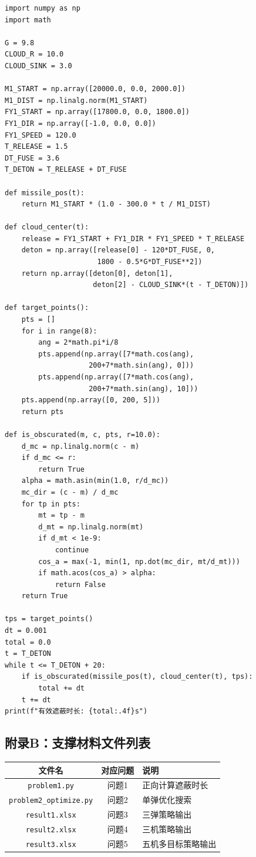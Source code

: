 \documentclass[a4paper]{ctexart}
\begin{document}
\begin{lstlisting}[caption={问题一有效遮蔽时长计算}]
import numpy as np
import math

G = 9.8
CLOUD_R = 10.0
CLOUD_SINK = 3.0

M1_START = np.array([20000.0, 0.0, 2000.0])
M1_DIST = np.linalg.norm(M1_START)
FY1_START = np.array([17800.0, 0.0, 1800.0])
FY1_DIR = np.array([-1.0, 0.0, 0.0])
FY1_SPEED = 120.0
T_RELEASE = 1.5
DT_FUSE = 3.6
T_DETON = T_RELEASE + DT_FUSE

def missile_pos(t):
    return M1_START * (1.0 - 300.0 * t / M1_DIST)

def cloud_center(t):
    release = FY1_START + FY1_DIR * FY1_SPEED * T_RELEASE
    deton = np.array([release[0] - 120*DT_FUSE, 0,
                      1800 - 0.5*G*DT_FUSE**2])
    return np.array([deton[0], deton[1],
                     deton[2] - CLOUD_SINK*(t - T_DETON)])

def target_points():
    pts = []
    for i in range(8):
        ang = 2*math.pi*i/8
        pts.append(np.array([7*math.cos(ang),
                    200+7*math.sin(ang), 0]))
        pts.append(np.array([7*math.cos(ang),
                    200+7*math.sin(ang), 10]))
    pts.append(np.array([0, 200, 5]))
    return pts

def is_obscurated(m, c, pts, r=10.0):
    d_mc = np.linalg.norm(c - m)
    if d_mc <= r:
        return True
    alpha = math.asin(min(1.0, r/d_mc))
    mc_dir = (c - m) / d_mc
    for tp in pts:
        mt = tp - m
        d_mt = np.linalg.norm(mt)
        if d_mt < 1e-9:
            continue
        cos_a = max(-1, min(1, np.dot(mc_dir, mt/d_mt)))
        if math.acos(cos_a) > alpha:
            return False
    return True

tps = target_points()
dt = 0.001
total = 0.0
t = T_DETON
while t <= T_DETON + 20:
    if is_obscurated(missile_pos(t), cloud_center(t), tps):
        total += dt
    t += dt
print(f"有效遮蔽时长: {total:.4f}s")
\end{lstlisting}

\subsection*{附录B：支撑材料文件列表}

\begin{table}[H]
\centering
{}
\begin{tabular}{c|c|p{6cm}}
\toprule
文件名 & 对应问题 & 说明 \\
\midrule
\texttt{problem1.py} & 问题1 & 正向计算遮蔽时长 \\
\texttt{problem2\_optimize.py} & 问题2 & 单弹优化搜索 \\
\texttt{result1.xlsx} & 问题3 & 三弹策略输出 \\
\texttt{result2.xlsx} & 问题4 & 三机策略输出 \\
\texttt{result3.xlsx} & 问题5 & 五机多目标策略输出 \\
\bottomrule
\end{tabular}
\end{table}
\end{document}
